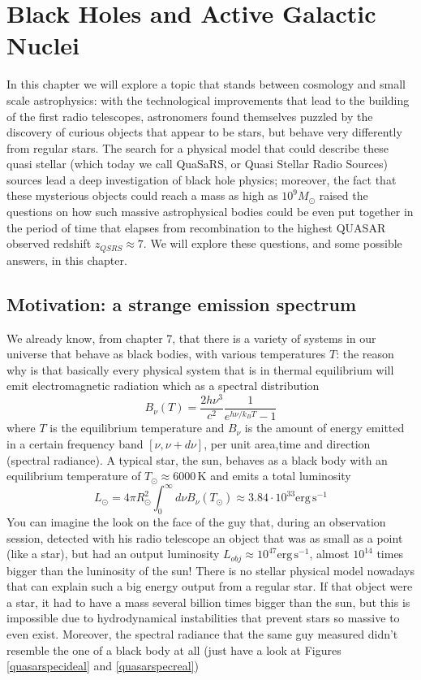 \chapter{Black Holes and Active Galactic Nuclei}
In this chapter we will explore a topic that stands between cosmology and small scale astrophysics: with the technological improvements that lead to the building of the first radio telescopes, astronomers found themselves puzzled by the discovery of curious objects that appear to be stars, but behave very differently from regular stars. The search for a physical model that could describe these quasi stellar (which today we call QuaSaRS, or Quasi Stellar Radio Sources) sources lead a deep investigation of black hole physics; moreover, the fact that these mysterious objects could reach a mass as high as $10^9 M_\odot$ raised the questions on how such massive astrophysical bodies could be even put together in the period of time that elapses from recombination to the highest QUASAR observed redshift $z_{QSRS}\approx7$. We will explore these questions, and some possible answers, in this chapter. 

\section{Motivation: a strange emission spectrum}
We already know, from chapter 7, that there is a variety of systems in our universe that behave as black bodies, with various temperatures $T$: the reason why is that basically every physical system that is in thermal equilibrium will emit electromagnetic radiation which as a spectral distribution
\begin{equation}
B_\nu(T) = \frac{2h\nu^3}{c^2}\frac{1}{e^{h\nu/k_BT}-1}
\end{equation} 
where $T$ is the equilibrium temperature and $B_\nu$ is the amount of energy emitted in a certain frequency band $[\nu,\nu+d\nu]$, per unit area,time and direction (spectral radiance). A typical star, the sun, behaves as a black body with an equilibrium temperature of $T_\odot\approx 6000$\,K and emits a total luminosity
\begin{equation}
L_\odot = 4\pi R_\odot^2\int_{0}^\infty d\nu B_\nu(T_\odot)\approx 3.84\cdot 10^{33}\mathrm{erg}\,\mathrm{s}^{-1}
\end{equation}
You can imagine the look on the face of the guy that, during an observation session, detected with his radio telescope an object that was as small as a point (like a star), but had an output luminosity $L_{obj}\approx 10^{47}\mathrm{erg}\,\mathrm{s}^{-1}$, almost $10^{14}$ times bigger than the luninosity of the sun! There is no stellar physical model nowadays that can explain such a big energy output from a regular star. If that object were a star, it had to have a mass several billion times bigger than the sun, but this is impossible due to hydrodynamical instabilities that prevent stars so massive to even exist. Moreover, the spectral radiance that the same guy measured didn't resemble the one of a black body at all (just have a look at Figures \ref{quasarspecideal} and \ref{quasarspecreal})

